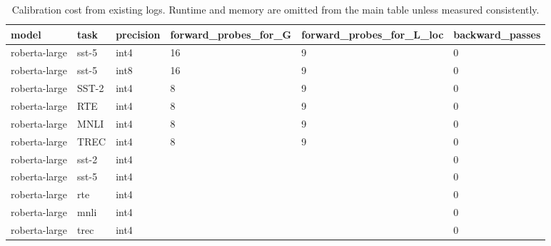 \begin{table}[t]
\centering
\small
\begin{tabular}{llllll}
\toprule
model & task & precision & forward\_probes\_for\_G & forward\_probes\_for\_L\_loc & backward\_passes \\
\midrule
roberta-large & sst-5 & int4 & 16 & 9 & 0 \\
roberta-large & sst-5 & int8 & 16 & 9 & 0 \\
roberta-large & SST-2 & int4 & 8 & 9 & 0 \\
roberta-large & RTE & int4 & 8 & 9 & 0 \\
roberta-large & MNLI & int4 & 8 & 9 & 0 \\
roberta-large & TREC & int4 & 8 & 9 & 0 \\
roberta-large & sst-2 & int4 &  &  & 0 \\
roberta-large & sst-5 & int4 &  &  & 0 \\
roberta-large & rte & int4 &  &  & 0 \\
roberta-large & mnli & int4 &  &  & 0 \\
roberta-large & trec & int4 &  &  & 0 \\
\bottomrule
\end{tabular}
\caption{Calibration cost from existing logs. Runtime and memory are omitted from the main table unless measured consistently.}
\label{tab:cost_stability}
\end{table}
